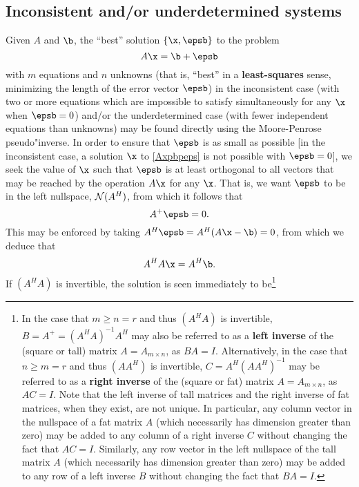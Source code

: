 \subsection{Inconsistent and/or underdetermined systems}\label{sec.A.E.A}

Given $A$ and $\b$, the ``best'' solution $\{\x,\epsb\}$ to the
problem
\begin{equation}
    A\x=\b+\epsb
\label{Axpbpeps}
\end{equation}
with $m$ equations and $n$ unknowns (that is, ``best'' in a {\bf
least-squares} sense, minimizing the length of the error vector
$\epsb$) in the inconsistent case (with two or more equations which
are impossible to satisfy simultaneously for any $\x$ when $\epsb=0$)
and/or the underdetermined case (with fewer independent equations than
unknowns) may be found directly using the Moore-Penrose pseudo"inverse.
In order to ensure that $\epsb$ is as small as possible [in the
inconsistent case, a solution $\x$ to \eqref{Axpbpeps} is not possible
with $\epsb=0$], we seek the value of $\x$ such that $\epsb$ is at
least orthogonal to all vectors that may be reached by the operation
$A\x$ for any $\x$.  That is, we want $\epsb$ to be in the left
nullspace, ${\cal N}(A^{H})$, from which it follows that
\begin{equation}
A^{+}\epsb=0.
\label{ape=z}
\end{equation}
This may be enforced by taking $A^{H}\epsb= A^{H}(A\x-\b)=0$, from
which we deduce that
\begin{equation}
    A^{H} A \x=A^{H}\b.
\label{AHAx=AHb}
\end{equation}
If $(A^{H} A)$ is invertible, the solution is seen immediately to be\footnote{In the case that $m\ge n=r$ and thus $(A^{H} A)$ is invertible, $B=A^+=(A^H A)^{-1} A^H$ may also be referred to as a {\bf left inverse} of the (square or tall) matrix $A=A_{m\times n}$, as $B A=I$.  Alternatively, in the case that $n\ge m=r$ and thus $(A A^H)$ is invertible, $C=A^H (A A^H)^{-1}$ may be referred to as a {\bf right inverse} of the (square or fat) matrix $A=A_{m\times n}$, as $A C=I$.  Note that the left inverse of tall matrices and the right inverse of fat matrices, when they exist, are not unique.  In particular, any column vector in the nullspace of a fat matrix $A$ (which necessarily has dimension greater than zero) may be added to any column of a right inverse $C$ without changing the fact that $A C=I$.  Similarly, any row vector in the left nullspace of the tall matrix $A$ (which necessarily has dimension greater than zero) may be added to any row of a left inverse $B$ without changing the fact that $B A =I$.}
